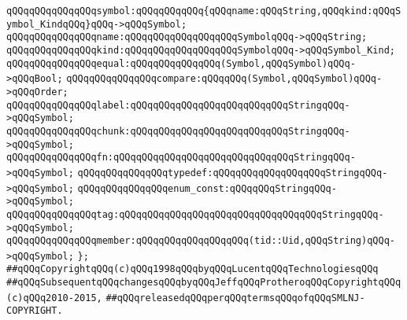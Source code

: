 \newline
\verb|qQQqqQQqqQQqqQQqsymbol:qQQqqQQqqQQq{qQQqname:qQQqString,qQQqkind:qQQqSymbol_KindqQQq}qQQq->qQQqSymbol;|\newline
\verb|qQQqqQQqqQQqqQQqname:qQQqqQQqqQQqqQQqqQQqSymbolqQQq->qQQqString;|\newline
\verb|qQQqqQQqqQQqqQQqkind:qQQqqQQqqQQqqQQqqQQqSymbolqQQq->qQQqSymbol_Kind;|\newline
\verb|qQQqqQQqqQQqqQQqequal:qQQqqQQqqQQqqQQq(Symbol,qQQqSymbol)qQQq->qQQqBool;|\newline
\verb|qQQqqQQqqQQqqQQqcompare:qQQqqQQq(Symbol,qQQqSymbol)qQQq->qQQqOrder;|\newline
\newline
\verb|qQQqqQQqqQQqqQQqlabel:qQQqqQQqqQQqqQQqqQQqqQQqqQQqStringqQQq->qQQqSymbol;|\newline
\verb|qQQqqQQqqQQqqQQqchunk:qQQqqQQqqQQqqQQqqQQqqQQqqQQqStringqQQq->qQQqSymbol;|\newline
\verb|qQQqqQQqqQQqqQQqfn:qQQqqQQqqQQqqQQqqQQqqQQqqQQqqQQqStringqQQq->qQQqSymbol;|\newline
\verb|qQQqqQQqqQQqqQQqtypedef:qQQqqQQqqQQqqQQqqQQqStringqQQq->qQQqSymbol;|\newline
\verb|qQQqqQQqqQQqqQQqenum_const:qQQqqQQqStringqQQq->qQQqSymbol;|\newline
\verb|qQQqqQQqqQQqqQQqtag:qQQqqQQqqQQqqQQqqQQqqQQqqQQqqQQqqQQqStringqQQq->qQQqSymbol;|\newline
\verb|qQQqqQQqqQQqqQQqmember:qQQqqQQqqQQqqQQqqQQq(tid::Uid,qQQqString)qQQq->qQQqSymbol;|\newline
\newline
\verb|};|\newline
\newline
\newline
\newline
\verb|##qQQqCopyrightqQQq(c)qQQq1998qQQqbyqQQqLucentqQQqTechnologiesqQQq|\newline
\verb|##qQQqSubsequentqQQqchangesqQQqbyqQQqJeffqQQqProtheroqQQqCopyrightqQQq(c)qQQq2010-2015,|\newline
\verb|##qQQqreleasedqQQqperqQQqtermsqQQqofqQQqSMLNJ-COPYRIGHT.|\newline

